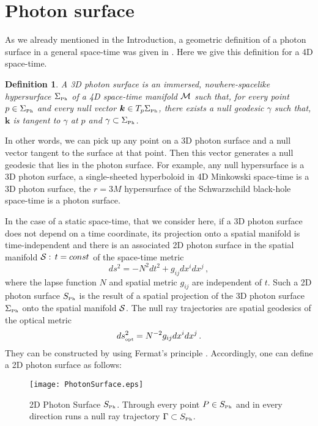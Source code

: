 \documentclass[twocolumn,showpacs,preprintnumbers,amsmath,amssymb,floatfix,nofootinbib]{revtex4-1}
\newcommand{\be}{\begin{equation}}
\newcommand{\ee}{\end{equation}}
\newcommand{\ind}[1]{\mbox{\tiny #1}}
\newtheorem{definition}{Definition}
\begin{document}
\section{Photon surface}

As we already mentioned in the Introduction, a geometric definition of a photon surface in a general space-time was given in \cite{Claudel:2000yi}. Here we give this definition for a 4D space-time. 
\begin{definition}
A 3D photon surface is an immersed, nowhere-spacelike hypersurface $\Sigma_{\ind{Ph}}$ of a 4D space-time manifold ${\cal M}$ such that, for every point $p\in\Sigma_{\ind{Ph}}$ and every null vector ${\bm k}\in T_p\Sigma_{\ind{Ph}}$,  there exists a null geodesic $\gamma$ such that, ${\bm k}$ is tangent to $\gamma$ at $p$ and $\gamma\subset\Sigma_{\ind{Ph}}$.                         
\end{definition}
In other words, we can pick up any point on a 3D photon surface and a null vector tangent to the surface at that point. Then this vector generates a null geodesic that lies in the photon surface. For example, any null hypersurface is a 3D photon surface, a single-sheeted hyperboloid in 4D Minkowski space-time is a 3D photon surface, the $r=3M$ hypersurface of the Schwarzschild black-hole space-time is a photon surface. 

In the case of a static space-time, that we consider here, if a 3D photon surface does not depend on a time coordinate, its projection onto a spatial manifold is time-independent and there is an associated 2D photon surface in the spatial manifold ${\cal S}:\,t=const$ of the space-time metric
\be
ds^2=-N^2dt^2+g_{ij}dx^idx^j\,,
\ee
where the lapse function $N$ and spatial metric $g_{ij}$ are independent of $t$. Such a 2D photon surface $S_{\ind{Ph}}$ is the result of a spatial projection of the 3D photon surface $\Sigma_{\ind{Ph}}$ onto the spatial manifold ${\cal S}$. The null ray trajectories are spatial geodesics of the optical metric
\be
ds_{\ind{opt}}^2=N^{-2}g_{ij}dx^idx^j\,.
\ee 
They can be constructed by using Fermat's principle \cite{Gibbons:2016isj}. Accordingly, one can define a 2D photon surface as follows:

\begin{figure}[htb]
\begin{center}
\hspace{0cm}
\texttt{[image: PhotonSurface.eps]}
\caption{2D Photon Surface $S_{\ind{Ph}}$. Through every point $P\in S_{\ind{Ph}}$ and in every direction runs a null ray trajectory $\Gamma\subset S_{\ind{Ph}}$.}\label{fig1}
\end{center}
\end{figure}
\end{document}
